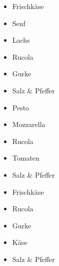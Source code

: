 \documentclass[12pt]{article}
\begin{document}
\vspace{1em}

\begin{minipage}[t]{0.48\textwidth}
    \begin{tcolorbox}[title = Lachs, left=0.5pt, arc=0pt]
        \begin{itemize}[itemsep=1pt, topsep=0pt]
            \item[-] Frischkäse
            \item[-] Senf
            \item[-] Lachs
            \item[-] Rucola
            \item[-] Gurke
            \item[-] Salz \& Pfeffer
        \end{itemize}
    \end{tcolorbox}
\end{minipage}
\hfill
\begin{minipage}[t]{0.48\textwidth}
    \begin{tcolorbox}[title= Tomaten - Mozzarella, left=0.5pt, arc=0pt]
        \begin{itemize}[itemsep=1pt, topsep=0pt]
            \item[-] Pesto
            \item[-] Mozzarella
            \item[-] Rucola
            \item[-] Tomaten
            \item[-] Salz \& Pfeffer
        \end{itemize}
    \end{tcolorbox}
\end{minipage}

\vspace{1em}

\begin{minipage}[t]{0.48\textwidth}
    \begin{tcolorbox}[title = Creamcheese, left=0.5pt, arc=0pt]
        \begin{itemize}[itemsep=1pt, topsep=0pt]
            \item[-] Frischkäse
            \item[-] Rucola
            \item[-] Gurke
            \item[-] Käse 
            \item[-] Salz \& Pfeffer
        \end{itemize}
    \end{tcolorbox}
\end{minipage}
\end{document}
